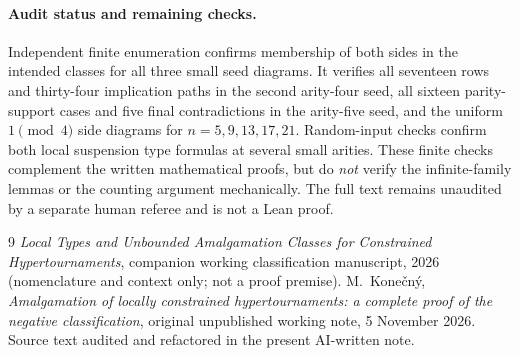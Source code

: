 \documentclass[11pt,a4paper]{article}
\theoremstyle{remark}
\begin{document}
\paragraph{Audit status and remaining checks.}
Independent finite enumeration confirms membership of both sides in
the intended classes for all three small seed diagrams. It verifies
all seventeen rows and thirty-four implication paths in the second
arity-four seed, all sixteen parity-support cases and five final
contradictions in the arity-five seed, and the uniform
$1\pmod4$ side diagrams for $n=5,9,13,17,21$.
Random-input checks confirm both local suspension type formulas at
several small arities. These finite checks complement the written
mathematical proofs, but do \emph{not} verify the infinite-family
lemmas or the counting argument mechanically. The full text remains
unaudited by a separate human referee and is not a Lean proof.

\begin{thebibliography}{9}
\emph{Local Types and Unbounded Amalgamation Classes for Constrained
Hypertournaments}, companion working classification manuscript,
2026 (nomenclature and context only; not a proof premise).
M.~Kone\v cn\'y,
\emph{Amalgamation of locally constrained hypertournaments:
a complete proof of the negative classification}, original
unpublished working note, 5 November 2026. Source text audited and
refactored in the present AI-written note.
\end{thebibliography}
\end{document}
